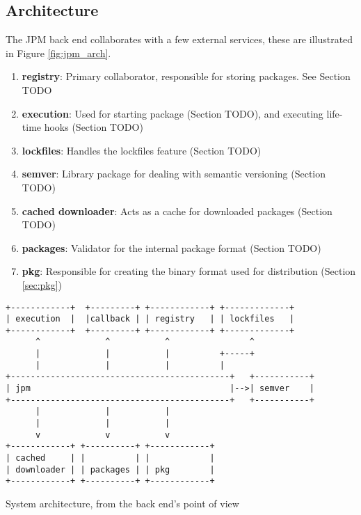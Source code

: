 \subsection{Architecture}

The JPM back end collaborates with a few external services, these are
illustrated in Figure \ref{fig:jpm_arch}.

\begin{enumerate}

\item \textbf{registry}: Primary collaborator, responsible for storing
packages. See Section TODO

\item \textbf{execution}: Used for starting package (Section TODO), and
executing life-time hooks (Section TODO)

\item \textbf{lockfiles}: Handles the lockfiles feature (Section TODO)

\item \textbf{semver}: Library package for dealing with semantic versioning
(Section TODO)

\item \textbf{cached downloader}: Acts as a cache for downloaded packages
(Section TODO)

\item \textbf{packages}: Validator for the internal package format (Section
TODO)

\item \textbf{pkg}: Responsible for creating the binary format used for
distribution (Section \ref{sec:pkg})

\end{enumerate}


\begin{listing}[H]
\begin{verbatim}
+------------+  +---------+ +------------+ +-------------+
| execution  |  |callback | | registry   | | lockfiles   |
+------------+  +---------+ +------------+ +-------------+
      ^             ^           ^                ^
      |             |           |          +-----+
      |             |           |          |
+--------------------------------------------+   +-----------+
| jpm                                        |-->| semver    |
+--------------------------------------------+   +-----------+
      |             |           |
      |             |           |
      v             v           v
+------------+ +----------+ +------------+
| cached     | |          | |            |
| downloader | | packages | | pkg        |
+------------+ +----------+ +------------+
\end{verbatim}
\caption{System architecture, from the back end's point of view}
\label{fig:jpm_arch}
\end{listing}

